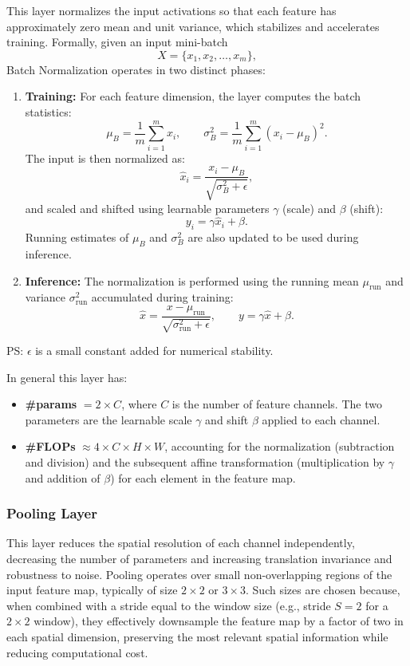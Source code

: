 This layer normalizes the input activations so that each feature has approximately zero mean and unit variance, which stabilizes and accelerates training.  
Formally, given an input mini-batch 
\[
X = \{x_1, x_2, \dots, x_m\},
\]
Batch Normalization operates in two distinct phases:

\begin{enumerate}
    \item \textbf{Training:}  
    For each feature dimension, the layer computes the batch statistics:
    \[
    \mu_B = \frac{1}{m} \sum_{i=1}^{m} x_i, \qquad 
    \sigma_B^2 = \frac{1}{m} \sum_{i=1}^{m} (x_i - \mu_B)^2.
    \]
    The input is then normalized as:
    \[
    \hat{x}_i = \frac{x_i - \mu_B}{\sqrt{\sigma_B^2 + \epsilon}},
    \]
    and scaled and shifted using learnable parameters $\gamma$ (scale) and $\beta$ (shift):
    \[
    y_i = \gamma \hat{x}_i + \beta.
    \]
    Running estimates of $\mu_B$ and $\sigma_B^2$ are also updated to be used during inference.

    \item \textbf{Inference:}  
    The normalization is performed using the running mean $\mu_\text{run}$ and variance $\sigma_\text{run}^2$ accumulated during training:
    \[
    \hat{x} = \frac{x - \mu_\text{run}}{\sqrt{\sigma_\text{run}^2 + \epsilon}}, \qquad
    y = \gamma \hat{x} + \beta.
    \]
\end{enumerate}

PS: $\epsilon$ is a small constant added for numerical stability.

In general this layer has:
\begin{itemize}
    \item \textbf{\#params} $= 2 \times C$,  
    where $C$ is the number of feature channels.  
    The two parameters are the learnable scale $\gamma$ and shift $\beta$ applied to each channel.

    \item \textbf{\#FLOPs} $\approx 4 \times C \times H \times W$,  
    accounting for the normalization (subtraction and division) and the subsequent affine transformation (multiplication by $\gamma$ and addition of $\beta$) for each element in the feature map.
\end{itemize}

\subsubsection{Pooling Layer}

This layer reduces the spatial resolution of each channel independently, decreasing the number of parameters and increasing translation invariance and robustness to noise.  
Pooling operates over small non-overlapping regions of the input feature map, typically of size $2 \times 2$ or $3 \times 3$.  
Such sizes are chosen because, when combined with a stride equal to the window size (e.g., stride $S=2$ for a $2 \times 2$ window), they effectively downsample the feature map by a factor of two in each spatial dimension, preserving the most relevant spatial information while reducing computational cost.

